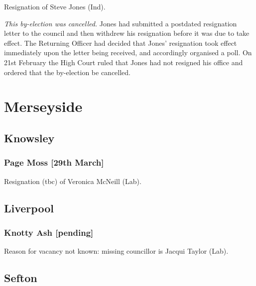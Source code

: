 \documentclass[a4paper,openany]{book}
\begin{document}
\begin{resultsiii}

Resignation of Steve Jones (Ind).

\emph{This by-election was cancelled.}  Jones had submitted a postdated resignation letter to the council and then withdrew his resignation before it was due to take effect.  The Returning Officer had decided that Jones' resignation took effect immediately upon the letter being received, and accordingly organised a poll.  On 21st February the High Court ruled that Jones had not resigned his office and ordered that the by-election be cancelled.

\section{Merseyside}

\subsection*{Knowsley}

\subsubsection*{Page Moss \hspace*{\fill}\nolinebreak[1]%
\enspace\hspace*{\fill}
[29th March]}


Resignation (tbc) of Veronica McNeill (Lab).

\subsection*{Liverpool}

\subsubsection*{Knotty Ash \hspace*{\fill}\nolinebreak[1]%
\enspace\hspace*{\fill}
[pending]}


Reason for vacancy not known: missing councillor is Jacqui Taylor (Lab).

\subsection*{Sefton}


\end{resultsiii}
\end{document}

